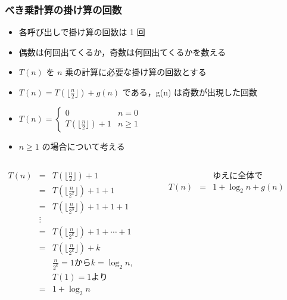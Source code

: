 \begin{frame}
\frametitle{べき乗計算の掛け算の回数}
  \begin{itemize}
\scriptsize
\item 各呼び出しで掛け算の回数は 1 回
\item 偶数は何回出てくるか，奇数は何回出てくるかを数える
\item \(T(n)\) を $n$ 乗の計算に必要な掛け算の回数とする
\item \(T(n) = T(\lfloor\frac{n}{2}\rfloor)+g(n)\) である，g(n) は奇数が出現した回数
\item \(T(n) =
    \begin{cases}
0 & n=0\\
T(\lfloor\frac{n}{2}\rfloor)+1 & n\geq 1
    \end{cases}\)
\item \(n\geq 1\) の場合について考える
  \end{itemize}
  \begin{columns}[t]
    \begin{column}{0.45\textwidth}
\centering
      \begin{math}
        \begin{array}{rcl}
T(n) &=& T(\lfloor\frac{n}{2}\rfloor)+1\\
     &=& T(\lfloor\frac{n}{2^2}\rfloor)+1+1\\
     &=& T(\lfloor\frac{n}{2^3}\rfloor)+1+1+1\\
&\vdots&\\
     &=& T(\lfloor\frac{n}{2^k}\rfloor)+1+\cdots+1\\
     &=& T(\lfloor\frac{n}{2^k}\rfloor)+k\\
     && \text{\(\frac{n}{2^k}=1\)から\(k=\log_2 n\),}\\
     && \text{\(T(1)=1\)より}\\
     &=& 1+\log_2 n\\
        \end{array}
      \end{math}
    \end{column}
    \begin{column}{0.35\textwidth}
      \begin{math}
        \begin{array}{rcl}
     && \text{ゆえに全体で}\\
T(n) &=& 1+\log_2 n + g(n)
        \end{array}
      \end{math}
    \end{column}
  \end{columns}
\end{frame}
